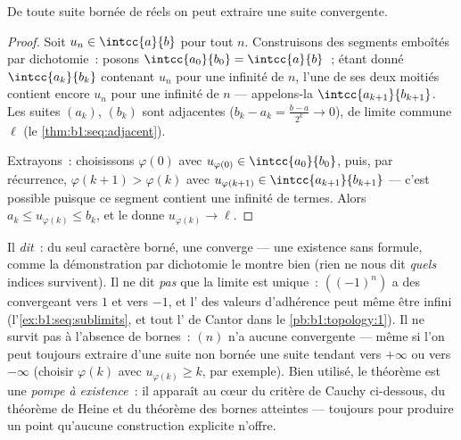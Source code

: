 \begin{theorem}\label{thm:b1:seq:bw}
De toute suite bornée de réels on peut extraire une suite
convergente.
\end{theorem}

\begin{proof}
Soit $u_n \in \intcc{a}{b}$ pour tout $n$. Construisons des segments
emboîtés par dichotomie~: posons $\intcc{a_0}{b_0} = \intcc{a}{b}$~;
étant donné $\intcc{a_k}{b_k}$ contenant $u_n$ pour une infinité de
$n$, l'une de ses deux moitiés contient encore $u_n$ pour une infinité
de $n$ --- appelons-la $\intcc{a_{k+1}}{b_{k+1}}$. Les suites $(a_k)$,
$(b_k)$ sont adjacentes ($b_k - a_k = \frac{b-a}{2^k} \to 0$), de
limite commune $\ell$ (le \cref{thm:b1:seq:adjacent}).

Extrayons~: choisissons $\varphi(0)$ avec $u_{\varphi(0)} \in
\intcc{a_0}{b_0}$, puis, par récurrence, $\varphi(k+1) > \varphi(k)$
avec $u_{\varphi(k+1)} \in \intcc{a_{k+1}}{b_{k+1}}$ --- c'est
possible puisque ce segment contient une infinité de termes. Alors
$a_k \leq u_{\varphi(k)} \leq b_k$, et le  donne
$u_{\varphi(k)} \to \ell$.
\end{proof}

\begin{remark}
Il \emph{dit}~: du seul caractère borné, une  converge
--- une existence sans formule, comme la démonstration par dichotomie
le montre bien (rien ne nous dit \emph{quels} indices survivent). Il
ne dit \emph{pas} que la limite est unique~: $((-1)^n)$ a des  convergeant vers $1$ et vers $-1$, et l' des valeurs
d'adhérence peut même être infini (l'\cref{ex:b1:seq:sublimits}, et
tout l' de Cantor dans le \cref{pb:b1:topology:1}). Il ne
survit pas à l'absence de bornes~: $(n)$ n'a aucune 
convergente --- même si l'on peut toujours extraire d'une suite non
bornée une suite tendant vers $+\infty$ ou vers $-\infty$ (choisir
$\varphi(k)$ avec $u_{\varphi(k)} \geq k$, par exemple). Bien
utilisé, le théorème est une \emph{pompe à existence}~: il apparaît
au cœur du critère de Cauchy ci-dessous, du théorème de Heine et du
théorème des bornes atteintes --- toujours pour produire un point
qu'aucune construction explicite n'offre.
\end{remark}

